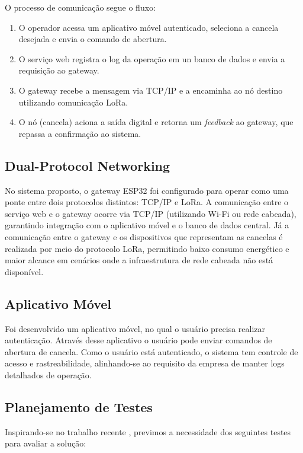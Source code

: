 \documentclass[
article,			%
11pt,				%
twoside,			%
a4paper,			%
section=TITLE,		%
onecolumn,          %
english,			%
brazil,				%
sumario=tradicional
]{abntex2}
\begin{document}
    O processo de comunicação segue o fluxo:
    \begin{enumerate}
        \item O operador acessa um aplicativo móvel autenticado, seleciona a cancela desejada e envia o comando de abertura.
        \item O serviço web registra o log da operação em un banco de dados e envia a requisição ao gateway.
        \item O gateway recebe a mensagem via TCP/IP e a encaminha ao nó destino utilizando comunicação LoRa.
        \item O nó (cancela) aciona a saída digital e retorna um \textit{feedback} ao gateway, que repassa a confirmação ao sistema.
    \end{enumerate}
    
    \subsection{Dual-Protocol Networking}
    No sistema proposto, o gateway ESP32 foi configurado para operar como uma ponte entre dois protocolos distintos: TCP/IP e LoRa. 
    A comunicação entre o serviço web e o gateway ocorre via TCP/IP (utilizando Wi-Fi ou rede cabeada), garantindo integração com o aplicativo móvel e o banco de dados central. 
    Já a comunicação entre o gateway e os dispositivos que representam as cancelas é realizada por meio do protocolo LoRa, permitindo baixo consumo energético e maior alcance em cenários onde a infraestrutura de rede cabeada não está disponível.

    \subsection{Aplicativo Móvel}
    Foi desenvolvido um aplicativo móvel, no qual o usuário precisa realizar autenticação. Através desse aplicativo o usuário pode enviar comandos de abertura de cancela. Como o usuário está autenticado, o sistema tem controle de acesso e rastreabilidade, alinhando-se ao requisito da empresa de manter logs detalhados de operação.
    
    \subsection{Planejamento de Testes}
    Inspirando-se no trabalho recente \cite{rahmatullah2025}, previmos a necessidade dos seguintes testes para avaliar a solução:
\end{document}
